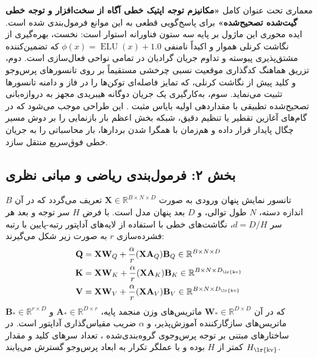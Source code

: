 معماری  تحت عنوان کامل \textbf{«مکانیزم توجه اپتیک خطی آگاه از سخت‌افزار و توجه خطی گیت‌شده تصحیح‌شده» } برای پاسخ‌گویی قطعی به این موانع فرمول‌بندی شده است. ایده محوری این ماژول بر پایه سه ستون فناورانه استوار است:
نخست، بهره‌گیری از نگاشت کرنلی هموار و اکیداً نامنفی $\phi(x) = \operatorname{ELU}(x) + 1.0$ که تضمین‌کننده مشتق‌پذیری پیوسته و تداوم جریان گرادیان در تمامی نواحی فعال‌سازی است. دوم، تزریق هماهنگ کدگذاری موقعیت نسبی چرخشی  مستقیماً بر روی تانسورهای پرس‌وجو و کلید پیش از نگاشت کرنلی، که تمایز فاصله‌ای توکن‌ها را در فاز و دامنه تانسورها تثبیت می‌نماید. سوم، به‌کارگیری یک جریان دوگانه هیبریدی  مجهز به دروازه‌بانی تصحیح‌شده تطبیقی  با مقداردهی اولیه بایاس مثبت . این طراحی موجب می‌شود که در گام‌های آغازین تقطیر یا تنظیم دقیق، شبکه بخش اعظم بار بازنمایی را بر دوش مسیر چگال پایدار قرار داده و هم‌زمان با همگرا شدن بردارها، بار محاسباتی را به جریان خطی فوق‌سریع منتقل سازد.

\subsection*{بخش ۲: فرمول‌بندی ریاضی و مبانی نظری }
تانسور نمایش پنهان ورودی به صورت $\mathbf{X} \in \mathbb{R}^{B \times N \times D}$ تعریف می‌گردد که در آن $B$ اندازه دسته، $N$ طول توالی، و $D$ بعد پنهان مدل است. با فرض $H$ سر توجه و بعد هر سر $d = D/H$، نگاشت‌های خطی با استفاده از لایه‌های آداپتور رتبه-پایین  با رتبه فشرده‌سازی $r$ به صورت زیر شکل می‌گیرند:
\begin{align}
    \mathbf{Q} &= \mathbf{X}\mathbf{W}_Q + \frac{\alpha}{r} (\mathbf{X}\mathbf{A}_Q)\mathbf{B}_Q \in \mathbb{R}^{B \times N \times D} \\
    \mathbf{K} &= \mathbf{X}\mathbf{W}_K + \frac{\alpha}{r} (\mathbf{X}\mathbf{A}_K)\mathbf{B}_K \in \mathbb{R}^{B \times N \times D_{\text{\lr{kv}}}} \\
    \mathbf{V} &= \mathbf{X}\mathbf{W}_V + \frac{\alpha}{r} (\mathbf{X}\mathbf{A}_V)\mathbf{B}_V \in \mathbb{R}^{B \times N \times D_{\text{\lr{kv}}}}
\end{align}
که در آن $\mathbf{W}_* \in \mathbb{R}^{D \times D}$ ماتریس‌های وزن منجمد پایه، $\mathbf{A}_* \in \mathbb{R}^{D \times r}$ و $\mathbf{B}_* \in \mathbb{R}^{r \times D}$ ماتریس‌های سازگارکننده آموزش‌پذیر، و $\alpha$ ضریب مقیاس‌گذاری آداپتور است. در ساختارهای مبتنی بر توجه پرس‌وجوی گروه‌بندی‌شده ، تعداد سرهای کلید و مقدار $H_{\text{\lr{kv}}}$ کمتر از $H$ بوده و با عملگر تکرار به ابعاد پرس‌وجو گسترش می‌یابند.

